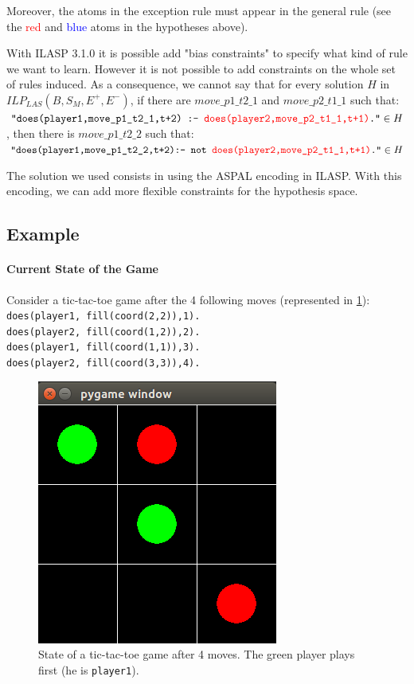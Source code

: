 \documentclass[12pt,twoside]{report}
\begin{document}

Moreover, the atoms in the exception rule must appear in the general rule (see the \textcolor{red}{red} and \textcolor{blue}{blue} atoms in the hypotheses above).

\bigskip

With ILASP 3.1.0 it is possible add "bias constraints" to specify what kind of rule we want to learn. However it is not possible to add constraints on the whole set of rules induced. As a consequence, we cannot say that for every solution $H$ in $ILP_{LAS}(B,S_M,E^+,E^-)$, 
if there are $move\_p1\_t2\_1$ and $move\_p2\_t1\_1$ such that:
\\ $\texttt{"does(player1,move\_p1\_t2\_1,t+2) :- \textcolor{red}{does(player2,move\_p2\_t1\_1,t+1)}."}\in H$, 
then there is $move\_p1\_t2\_2$ such that:\\
$\texttt{"does(player1,move\_p1\_t2\_2,t+2):- not \textcolor{red}{does(player2,move\_p2\_t1\_1,t+1)}."}\in H$

\bigskip

The solution we used consists in using the ASPAL encoding in ILASP. With this encoding, we can add more flexible constraints for the hypothesis space.

\subsection{Example}

\paragraph{Current State of the Game}

Consider a tic-tac-toe game after the 4 following moves (represented in \ref{fig:ttt_ex}):\newline
\texttt{does(player1, fill(coord(2,2)),1).\\
does(player2, fill(coord(1,2)),2).\\
does(player1, fill(coord(1,1)),3).\\
does(player2, fill(coord(3,3)),4).}

\begin{figure}[h]
\centering
\includegraphics[width = 0.3\hsize]{ttt_example.png}
\caption{State of a tic-tac-toe game after 4 moves. The green player plays first (he is \texttt{player1}).}
\label{fig:ttt_ex}
\end{figure}
\end{document}
